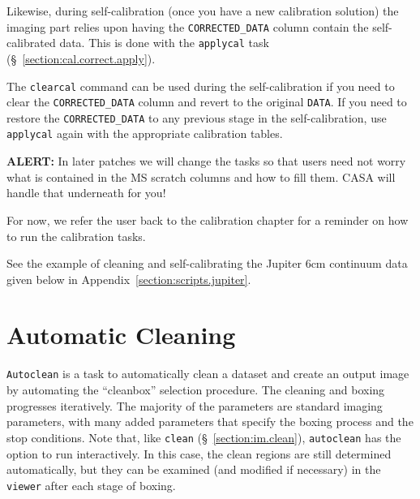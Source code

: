Likewise, during self-calibration (once you have a new calibration
solution) the imaging part
relies upon having the {\tt CORRECTED\_DATA} column contain
the self-calibrated data.  This is done with the {\tt applycal}
task (\S~\ref{section:cal.correct.apply}).  

The {\tt clearcal} command can be used during the self-calibration if
you need to clear the {\tt CORRECTED\_DATA} column and revert to the
original {\tt DATA}.  If you need to restore the {\tt CORRECTED\_DATA}
to any previous stage in the self-calibration, use {\tt applycal}
again with the appropriate calibration tables.

{\bf ALERT:} In later patches we
will change the tasks so that users need not worry what is contained in
the MS scratch columns and how to fill them.  CASA will handle that 
underneath for you!

For now, we refer the user back to the calibration chapter for
a reminder on how to run the calibration tasks. 

See the example of cleaning and self-calibrating the Jupiter 6cm continuum
data given below in Appendix~\ref{section:scripts.jupiter}.  

\section{Automatic Cleaning}
\label{section:im.autoclean}

{\tt Autoclean} is a task to automatically clean a dataset and create an output
image by automating the ``cleanbox'' selection procedure.  The cleaning and
boxing progresses iteratively.  The majority of the parameters are standard
imaging parameters, with many added parameters that specify the boxing process
and the stop conditions.  Note that, like {\tt clean}
(\S~\ref{section:im.clean}), {\tt autoclean} has the option to run
interactively.  In this case, the clean regions are still determined
automatically, but they can be examined (and modified if necessary) in the {\tt
viewer} after each stage of boxing.


